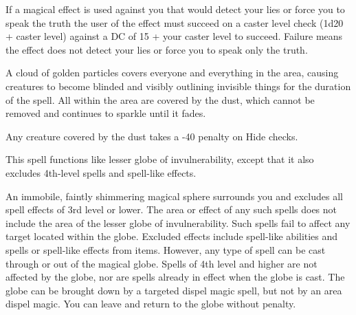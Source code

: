 \begin{multicols}{2}
\begin{small}
\smallskip\noindent If a magical effect is used against you that would detect your lies or force you to speak the truth the user of the effect must succeed on a caster level check (1d20 + caster level) against a DC of 15 + your caster level to succeed. Failure means the effect does not detect your lies or force you to speak only the truth.

\noindent A cloud of golden particles covers everyone and everything in the area, causing creatures to become blinded and visibly outlining invisible things for the duration of the spell. All within the area are covered by the dust, which cannot be removed and continues to sparkle until it fades.

\smallskip\noindent Any creature covered by the dust takes a -40 penalty on Hide checks.


\noindent This spell functions like lesser globe of invulnerability, except that it also excludes 4th-level spells and spell-like effects.

\noindent An immobile, faintly shimmering magical sphere surrounds you and excludes all spell effects of 3rd level or lower. The area or effect of any such spells does not include the area of the lesser globe of invulnerability. Such spells fail to affect any target located within the globe. Excluded effects include spell-like abilities and spells or spell-like effects from items. However, any type of spell can be cast through or out of the magical globe. Spells of 4th level and higher are not affected by the globe, nor are spells already in effect when the globe is cast. The globe can be brought down by a targeted dispel magic spell, but not by an area dispel magic. You can leave and return to the globe without penalty.


\end{small}
\end{multicols}

